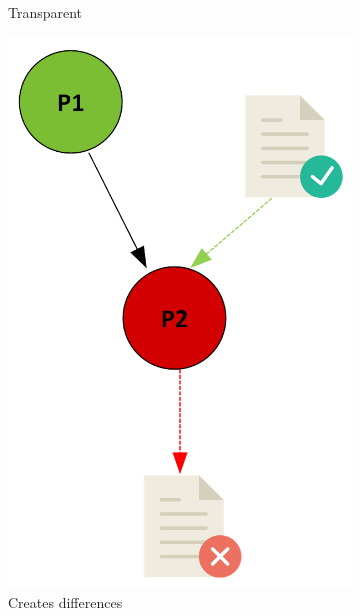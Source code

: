\documentclass[a4paper,num-refs]{oup-contemporary}
\begin{document}
\begin{figure}
\begin{subfigure}{0.2\linewidth}
        \caption{Transparent}
        \label{fig:green}
    \end{subfigure}
    \hfill
    \begin{subfigure}{0.2\linewidth}
    \includegraphics[scale=0.3]{images/red.png}
    \caption{Creates differences}
    \label{fig:red}
    \end{subfigure}
    \hfill
    \begin{subfigure}{0.2\linewidth}

\end{subfigure}
\end{figure}
\end{document}
